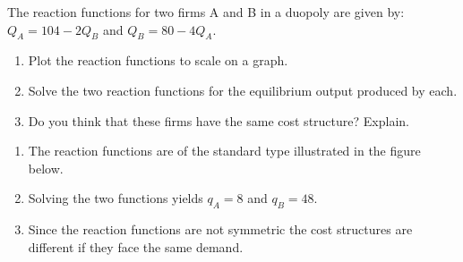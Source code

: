 \begin{enumialphparenastyle}
\begin{ex}\label{ex:ch11ex7}
The reaction functions for two firms A and B in a duopoly are given by: $Q_A=104-2Q_B$ and $Q_B=80-4Q_A$.
\begin{enumerate}
	\item	Plot the reaction functions to scale on a graph.
	\item	Solve the two reaction functions for the equilibrium output produced by each.
	\item	Do you think that these firms have the same cost structure? Explain.
\end{enumerate}
\begin{sol}
\begin{enumerate}
	\item	The reaction functions are of the standard type illustrated in the figure below.
	\item	Solving the two functions yields $q_A=8$ and $q_B=48$.
	\item	Since the reaction functions are not symmetric the cost structures are different if they face the same demand.
\end{enumerate}
\begin{center}
\end{center}
\end{sol}
\end{ex}


\end{enumialphparenastyle}
